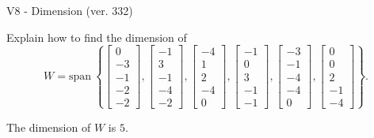\begin{exercise}
  \begin{exerciseTitle}V8 - Dimension (ver. 332)\end{exerciseTitle}
  \begin{exerciseStatement}
    Explain how to find the dimension of 
\[W=\mathrm{span}\ \left\{\left[\begin{array}{r}
0 \\
-3 \\
-1 \\
-2 \\
-2
\end{array}\right] , \left[\begin{array}{r}
-1 \\
3 \\
-1 \\
-4 \\
-2
\end{array}\right] , \left[\begin{array}{r}
-4 \\
1 \\
2 \\
-4 \\
0
\end{array}\right] , \left[\begin{array}{r}
-1 \\
0 \\
3 \\
-1 \\
-1
\end{array}\right] , \left[\begin{array}{r}
-3 \\
-1 \\
-4 \\
-4 \\
0
\end{array}\right] , \left[\begin{array}{r}
0 \\
0 \\
2 \\
-1 \\
-4
\end{array}\right]\right\}.\]



  \end{exerciseStatement}
  \begin{exerciseAnswer}
   The dimension of \(W\) is  \(5\).
  


  \end{exerciseAnswer}
\end{exercise}